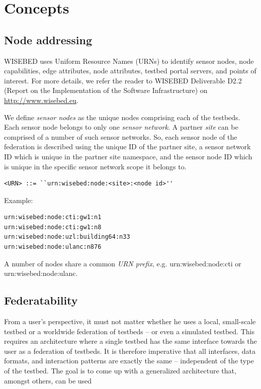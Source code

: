 \documentclass[a4paper,12pt]{article}
\begin{document}
	\section{Concepts}
	\label{sec:concepts}

	\subsection{Node addressing}
	\label{sec:addressing}
WISEBED uses Uniform Resource Names (URNs) to identify sensor nodes, node capabilities, edge attributes, node attributes, testbed portal servers, and 
points of interest. For more details, we refer the reader to WISEBED Deliverable D2.2 (Report on the Implementation of the Software Infrastructure) on \url{http://www.wisebed.eu}.

We define \textit{sensor nodes }as the unique nodes comprising each of the testbeds. Each sensor node belongs to only one \textit{sensor network}. A partner \textit{site} can be comprised of a number of such sensor networks. So, each sensor node of the federation is described using the unique ID of the partner site, a sensor network ID which is unique in the partner site namespace, and the sensor node ID which is unique in the specific sensor network scope it belongs to. 

\begin{lstlisting}
<URN> ::= ``urn:wisebed:node:<site>:<node id>''
\end{lstlisting}\medskip

\noindent Example: 

\begin{lstlisting}
urn:wisebed:node:cti:gw1:n1
urn:wisebed:node:cti:gw1:n8
urn:wisebed:node:uzl:building64:n33
urn:wisebed:node:ulanc:n876
\end{lstlisting}\medskip

A number of nodes share a common \emph{URN prefix}, e.g. urn:wisebed:node:cti or urn:wisebed:node:ulanc.

	\subsection{Federatability}
	\label{sec:federatability}
From a user's perspective, it must not matter whether he uses a local, small-scale testbed or a worldwide federation of testbeds -- or even a simulated testbed. This requires an architecture where a single testbed has the same interface towards the user as a federation of testbeds. It is therefore imperative that all interfaces, data formats, and interaction patterns are exactly the same -- independent of the type of the testbed. The goal is to come up with a generalized architecture that, amongst others, can be used 
\end{document}
